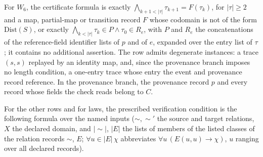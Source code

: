 \documentclass[11pt]{article}
\theoremstyle{definition}
\begin{document}
For \(W_6\), the certificate formula is exactly \(\bigwedge_{k+1<|\tau|}\tau_{k+1}=F(\tau_k)\), for \(|\tau|\ge2\) and a map, partial-map or transition record \(F\) whose codomain is not of the form \(\mathrm{Dist}(S)\), or exactly \(\bigwedge_{k<|\tau|}\tau_k\in P\wedge\tau_0\in R_e\), with \(P\) and \(R_e\) the concatenations of the reference-field identifier lists of \(p\) and of \(e\), expanded over the entry list of \(\tau\); it contains no additional assertion. The row admits degenerate instances: a trace \((s,s)\)
replayed by an identity map, and, since the provenance branch imposes no
length condition, a one-entry trace whose entry the event and provenance record
reference. In the provenance branch, the provenance record \(p\) and every
record whose fields the check reads belong to \(C\).

For the other rows and for laws, the prescribed verification condition is the
following formula over the named inputs (\(\sim,\sim'\) the source and target
relations, \(X\) the declared domain, and \(|{\sim}|\), \(|E|\) the lists of
members of the listed classes of the relation records \(\sim\), \(E\); \(\forall u\in|E|\,\chi\) abbreviates \(\forall u\,(E(u,u)\to\chi)\), \(u\) ranging over all declared records).
\end{document}
